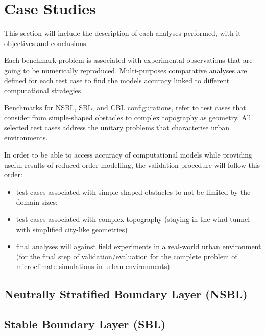 
\section{Case Studies}
This section will include the description of each analyses performed, with it objectives and conclusions.\newline

Each benchmark problem is associated with experimental observations that are going to be numerically reproduced. Multi-purposes comparative analyses are defined for each test case to find the models accuracy linked to different computational strategies.\newline

Benchmarks for NSBL, SBL, and CBL configurations, refer to test cases that consider from simple-shaped obstacles to complex topography as geometry. All selected test cases address the unitary problems that characterise urban environments.\newline



In order to be able to access accuracy of computational models while providing useful results of reduced-order modelling, the validation procedure will follow 
this order: 
\begin{itemize}
    \item test cases associated with simple-shaped obstacles to not be limited by the domain sizes;
    \item test cases associated with complex topography (staying
in the wind tunnel with simplified city-like geometries)
    \item final analyses will against field experiments in a real-world urban environment (for the final step of validation/evaluation for the complete problem of microclimate simulations in urban environments) 
\end{itemize}

\subsection{Neutrally Stratified Boundary Layer (NSBL)}
                    

\clearpage

\clearpage

\clearpage

\clearpage

\clearpage

\clearpage

\subsection{Stable Boundary Layer (SBL)}

